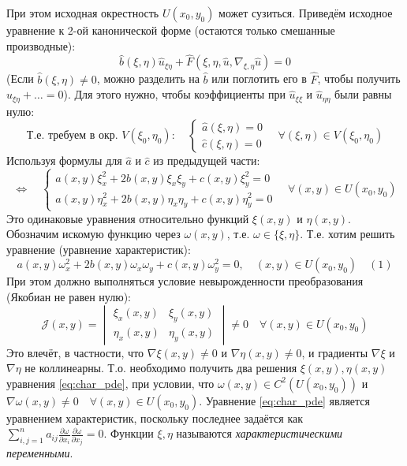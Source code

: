 \documentclass[12pt, a4paper]{article}
\begin{document}
При этом исходная окрестность $U(x_0, y_0)$ может сузиться. Приведём исходное уравнение к 2-ой канонической форме (остаются только смешанные производные):
\[
\hat{b}(\xi,\eta) \hat{u}_{\xi\eta} + \hat{F}(\xi, \eta, \hat{u}, \nabla_{\xi,\eta} \hat{u}) = 0
\]
(Если $\hat{b}(\xi,\eta) \neq 0$, можно разделить на $\hat{b}$ или поглотить его в $\hat{F}$, чтобы получить $\hat{u}_{\xi\eta} + \dots = 0$).
Для этого нужно, чтобы коэффициенты при $\hat{u}_{\xi\xi}$ и $\hat{u}_{\eta\eta}$ были равны нулю:
\[
\text{Т.е. требуем в окр. } V(\xi_0, \eta_0): \quad
\begin{cases}
\hat{a}(\xi,\eta) = 0 \\
\hat{c}(\xi,\eta) = 0
\end{cases}
\quad \forall (\xi,\eta) \in V(\xi_0, \eta_0)
\]
Используя формулы для $\hat{a}$ и $\hat{c}$ из предыдущей части:
\[
\Leftrightarrow \quad
\begin{cases}
a(x,y)\xi_x^2 + 2b(x,y)\xi_x\xi_y + c(x,y)\xi_y^2 = 0 \\
a(x,y)\eta_x^2 + 2b(x,y)\eta_x\eta_y + c(x,y)\eta_y^2 = 0
\end{cases}
\quad \forall (x,y) \in U(x_0, y_0)
\]
Это одинаковые уравнения относительно функций $\xi(x,y)$ и $\eta(x,y)$. Обозначим искомую функцию через $\omega(x,y)$, т.е. $\omega \in \{\xi, \eta\}$.
Т.е. хотим решить уравнение (уравнение характеристик):
\begin{equation} \label{eq:char_pde}
a(x,y)\omega_x^2 + 2b(x,y)\omega_x\omega_y + c(x,y)\omega_y^2 = 0, \quad (x,y) \in U(x_0, y_0) \quad (1)
\end{equation}
При этом должно выполняться условие невырожденности преобразования (Якобиан не равен нулю):
\[
\mathcal{J}(x,y) = \begin{vmatrix} \xi_x(x,y) & \xi_y(x,y) \\ \eta_x(x,y) & \eta_y(x,y) \end{vmatrix} \neq 0 \quad \forall (x,y) \in U(x_0, y_0)
\]
Это влечёт, в частности, что $\nabla \xi(x,y) \neq 0$ и $\nabla \eta(x,y) \neq 0$, и градиенты $\nabla \xi$ и $\nabla \eta$ не коллинеарны.
Т.о. необходимо получить два решения $\xi(x,y), \eta(x,y)$ уравнения \eqref{eq:char_pde}, при условии, что $\omega(x,y) \in C^2(U(x_0,y_0))$ и $\nabla \omega(x,y) \neq 0 \quad \forall (x,y) \in U(x_0,y_0)$.
Уравнение \eqref{eq:char_pde} является уравнением характеристик, поскольку последнее задаётся как $\sum_{i,j=1}^n a_{ij} \frac{\partial \omega}{\partial x_i} \frac{\partial \omega}{\partial x_j} = 0$.
Функции $\xi, \eta$ называются \textit{характеристическими переменными}.
\end{document}
